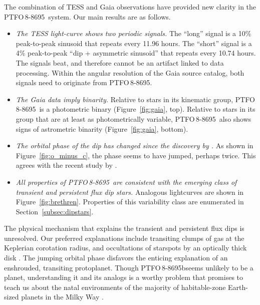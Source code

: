 \documentclass[12pt,twocolumn,tighten]{aastex62}
\newcommand{\ptfo}{PTFO$\,$8-8695}
\newcommand{\ptfob}{PTFO$\,$8-8695b}
\begin{document}
The combination of TESS and Gaia observations have provided new
clarity in the \ptfo\ system.  Our main results are as follows.
\begin{itemize}
  \item {\it The TESS light-curve shows two periodic signals.} The
    ``long'' signal is a 10\% peak-to-peak sinusoid that repeats every
    11.96 hours.  The ``short'' signal is a 4\% peak-to-peak ``dip +
    asymmetric sinusoid'' that repeats every 10.74 hours. The signals
    beat, and therefore cannot be an artifact linked to data
    processing.
    Within the angular resolution of the Gaia source
    catalog, both signals need to originate from \ptfo.
  \item {\it The Gaia data imply binarity.} Relative to stars in its
    kinematic group, \ptfo\ is a photometric binary
    (Figure~\ref{fig:gaia}, top).  Relative to stars in its group that
    are at least as photometrically variable, \ptfo\ also shows
    signs of astrometric binarity (Figure~\ref{fig:gaia}, bottom).
  \item {\it The orbital phase of the dip has changed since the
    discovery by \citet{van_eyken_ptf_2012}.} As shown in
    Figure~\ref{fig:o_minus_c}, the phase seems to have jumped,
    perhaps twice. This agrees with the recent study by
    \citet{tanimoto_evidence_2020}.
  \item {\it All properties of \ptfo\ are consistent with the emerging
    class of transient and persistent flux dip stars.} Analogous
    lightcurves are shown in Figure~\ref{fig:brethren}.  Properties of
    this variability class are enumerated in
    Section~\ref{subsec:dipstars}.
\end{itemize}

The physical mechanism that explains the transient and persistent flux
dips is unresolved. Our preferred explanations include
transiting clumps of gas at the Keplerian corotation radius, and
occultations of starspots by an optically thick disk \citep[{\it
e.g.},][]{stauffer_orbiting_2017,david_transient_2017,zhan_complex_2019}.
The jumping orbital phase disfavors the enticing explanation of an
enshrouded, transiting protoplanet.  Though \ptfob seems unlikely
to be a planet, understanding it and its analogs is a worthy
problem that promises to teach us about the natal environments of the
majority of habitable-zone Earth-sized planets in the Milky Way
\citep{dressing_occurrence_2013}.



\end{document}
